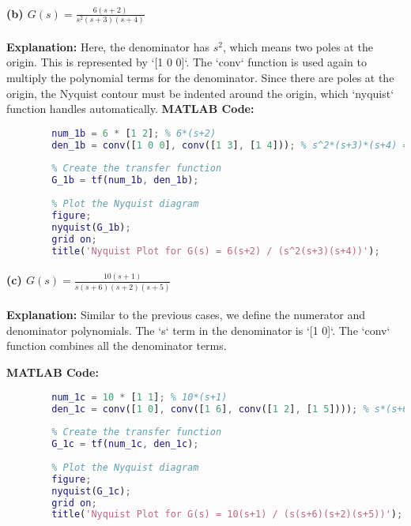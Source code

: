 \documentclass[a4paper,12pt]{article}
\begin{document}
	\paragraph{(b) $G(s)=\frac{6(s+2)}{s^2(s+3)(s+4)}$}
	\textbf{Explanation:}
	Here, the denominator has $s^2$, which means two poles at the origin. This is represented by `[1 0 0]`. The `conv` function is used again to multiply the polynomial terms for the denominator. Since there are poles at the origin, the Nyquist contour must be indented around the origin, which `nyquist` function handles automatically.
	\newpage
	\textbf{MATLAB Code:}
	\begin{lstlisting}[language=Matlab, caption=MATLAB Code for Problem 1(b)]
		% Define the numerator and denominator polynomials
		num_1b = 6 * [1 2]; % 6*(s+2)
		den_1b = conv([1 0 0], conv([1 3], [1 4])); % s^2*(s+3)*(s+4) = s^4 + 7s^3 + 12s^2
		
		% Create the transfer function
		G_1b = tf(num_1b, den_1b);
		
		% Plot the Nyquist diagram
		figure;
		nyquist(G_1b);
		grid on;
		title('Nyquist Plot for G(s) = 6(s+2) / (s^2(s+3)(s+4))');
	\end{lstlisting}
	
	\paragraph{(c) $G(s)=\frac{10(s+1)}{s(s+6)(s+2)(s+5)}$}
	\textbf{Explanation:}
	Similar to the previous cases, we define the numerator and denominator polynomials. The `s` term in the denominator is `[1 0]`. The `conv` function combines all the denominator terms.
	
	\textbf{MATLAB Code:}
	\begin{lstlisting}[language=Matlab, caption=MATLAB Code for Problem 1(c)]
		% Define the numerator and denominator polynomials
		num_1c = 10 * [1 1]; % 10*(s+1)
		den_1c = conv([1 0], conv([1 6], conv([1 2], [1 5]))); % s*(s+6)*(s+2)*(s+5)
		
		% Create the transfer function
		G_1c = tf(num_1c, den_1c);
		
		% Plot the Nyquist diagram
		figure;
		nyquist(G_1c);
		grid on;
		title('Nyquist Plot for G(s) = 10(s+1) / (s(s+6)(s+2)(s+5))');
	\end{lstlisting}
	
\end{document}
